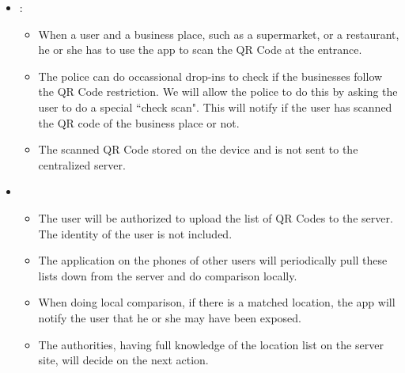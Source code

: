       \begin{itemize}
        \item {}:
          \begin{itemize}
            \item When a user  and  a business place, such as a supermarket, or a restaurant, he or she has to use the app to scan the QR Code at the entrance.
            \item The police can do occassional drop-ins to check if the businesses follow the QR Code restriction. We will allow the police to do this by asking the user to do a special ``check scan". This will notify if the user has scanned the QR code of the business place or not.
            \item The scanned QR Code stored on the device and is not sent to the centralized server.
          \end{itemize}
        \item {}
          \begin{itemize}
            \item The user will be authorized to upload the list of QR Codes to the server. The identity of the user is not included.
            \item The application on the phones of other users will periodically pull these lists down from the server and do comparison locally.
            \item When doing local comparison, if there is a matched location, the app will notify the user that he or she may have been exposed.
            \item The authorities, having full knowledge of the location list on the server site, will decide on the next action.
          \end{itemize}
      \end{itemize}
